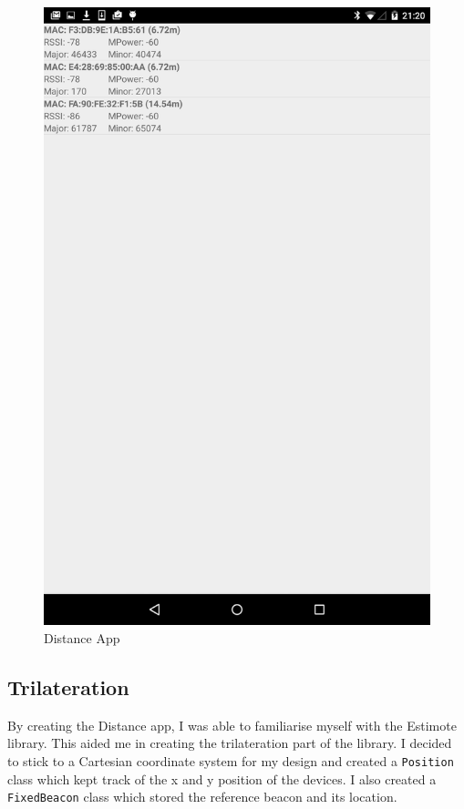 \begin{figure}[h]
  \includegraphics[scale=0.2]{images/distance}
  \protect\caption{Distance App} 
  \label{distance_app_image}
\end{figure}



\subsection{Trilateration} \label{nocamera_trilateration}

By creating the Distance app, I was able to familiarise myself with the Estimote library. This aided me in creating the trilateration part of the library. I decided to stick to a Cartesian coordinate system for my design and created a \lstinline|Position| class which kept track of the x and y position of the devices. I also created a \lstinline|FixedBeacon| class which stored the reference beacon and its location.

